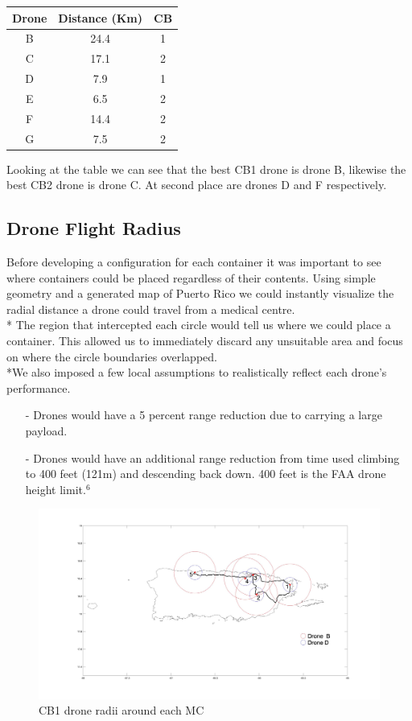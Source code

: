 \documentclass[a4paper,12pt]{article}
\begin{document}
\begin{center}
\begin{tabular}{ |c|c|c| }
 \hline
 Drone & Distance (Km) & CB \\\hline
  B & 24.4 & 1 \\
  C & 17.1 & 2  \\
  D & 7.9 & 1 \\
  E & 6.5 & 2 \\
  F & 14.4 & 2 \\
  G & 7.5 & 2 \\
 \hline
\end{tabular}
\end{center}
Looking at the table we can see that the best CB1 drone is drone B, likewise the best CB2 drone is drone C. At second place are drones D and F respectively.

\subsection{Drone Flight Radius}
Before developing a configuration for each container it was important to see where containers could be placed regardless of their contents.
Using simple geometry and a generated map of Puerto Rico we could instantly visualize the radial distance a drone could travel from a medical centre.\\*
The region that intercepted each circle would tell us where we could place a container. This allowed us to immediately discard any unsuitable area and focus on where the circle boundaries overlapped.
\\*We also imposed a few local assumptions to realistically reflect each drone's performance.

\begin{itemize}
\item[-]Drones would have a 5 percent range reduction due to carrying a large payload.
\item[-]Drones would have an additional range reduction from time used climbing to 400 feet (121m) and descending back down. 400 feet is the FAA drone height limit.$^6$
\end{itemize}

\begin{figure}[p]
\centering
\includegraphics[scale =0.15]{CB1}
\caption{CB1 drone radii around each MC}
\label{cb1}
\end{figure}
\end{document}
